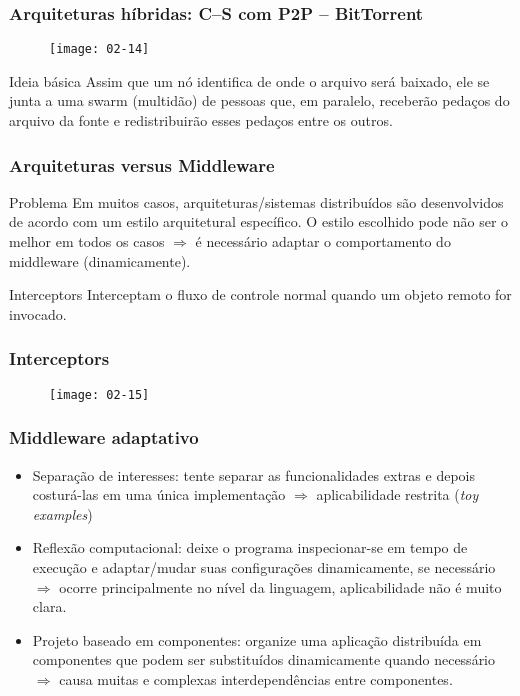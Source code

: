 \documentclass[Ligatures=TeX,table,brazil,svgnames,usetotalslideindicator,compress,10pt]{beamer}
\begin{document}
\begin{frame}
  \frametitle{Arquiteturas híbridas: C--S com P2P -- BitTorrent}

  \begin{figure}
    \centering
    \texttt{[image: 02-14]}
  \end{figure}

  \begin{block}{Ideia básica}
    Assim que um nó identifica de onde o arquivo será baixado, ele se junta a uma \alert{swarm} (multidão) de pessoas que, \alert{em paralelo}, receberão pedaços do arquivo da fonte e redistribuirão esses pedaços entre os outros.
  \end{block}
\end{frame}

\begin{frame}
  \frametitle{Arquiteturas versus Middleware}

  \begin{block}{Problema}
    Em muitos casos, arquiteturas/sistemas distribuídos são desenvolvidos de acordo com um estilo arquitetural específico. O estilo escolhido pode não ser o melhor em todos os casos $\Rightarrow$ é necessário \alert{adaptar o comportamento do middleware} (dinamicamente).
  \end{block}

  \begin{exampleblock}{Interceptors}
    Interceptam o fluxo de controle normal quando um \alert{objeto remoto} for invocado.
  \end{exampleblock}

\end{frame}


\begin{frame}
  \frametitle{Interceptors}
  \begin{figure}
    \centering
    \texttt{[image: 02-15]}
  \end{figure}
\end{frame}

\begin{frame}
  \frametitle{Middleware adaptativo}
  \begin{itemize}
  \item \alert{Separação de interesses}: tente separar as
    \alert{funcionalidades extras} e depois \alert{costurá-las} em uma
    única implementação $\Rightarrow$ aplicabilidade restrita (\textit{toy examples})
  \item \alert{Reflexão computacional}: deixe o programa inspecionar-se em tempo de execução e adaptar/mudar suas configurações dinamicamente, se necessário  $\Rightarrow$ ocorre principalmente no nível da linguagem, aplicabilidade não é muito clara.
  \item \alert{Projeto baseado em componentes}: organize uma aplicação distribuída em componentes que podem ser substituídos dinamicamente quando necessário  $\Rightarrow$ causa muitas e complexas interdependências entre componentes.

  \end{itemize}
\end{frame}
\end{document}
